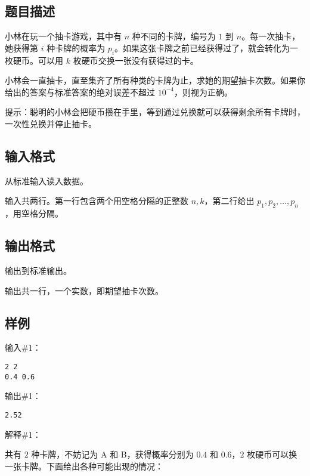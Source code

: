 \subsection*{题目描述}

小林在玩一个抽卡游戏，其中有 $n$ 种不同的卡牌，编号为 $1$ 到 $n$。每一次抽卡，她获得第 $i$ 种卡牌的概率为 $p_i$。如果这张卡牌之前已经获得过了，就会转化为一枚硬币。可以用 $k$ 枚硬币交换一张没有获得过的卡。

小林会一直抽卡，直至集齐了所有种类的卡牌为止，求她的期望抽卡次数。如果你给出的答案与标准答案的绝对误差不超过 $10^{-4}$，则视为正确。

提示：聪明的小林会把硬币攒在手里，等到通过兑换就可以获得剩余所有卡牌时，一次性兑换并停止抽卡。

\subsection*{输入格式}

从标准输入读入数据。

输入共两行。第一行包含两个用空格分隔的正整数 $n, k$，第二行给出 $p_1, p_2, \dots, p_n$，用空格分隔。

\subsection*{输出格式}

输出到标准输出。

输出共一行，一个实数，即期望抽卡次数。

\subsection*{样例}

输入\#1：

\begin{lstlisting}
2 2
0.4 0.6
\end{lstlisting}

输出\#1：

\begin{lstlisting}
2.52
\end{lstlisting}

解释\#1：

共有 $2$ 种卡牌，不妨记为 A 和 B，获得概率分别为 $0.4$ 和 $0.6$，$2$ 枚硬币可以换一张卡牌。下面给出各种可能出现的情况：

